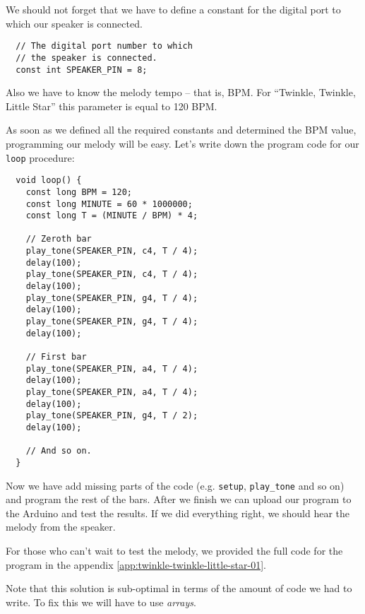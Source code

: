 \documentclass[../sparc.tex]{subfiles}
\begin{document}
We should not forget that we have to define a constant for the digital port to
which our speaker is connected.

\begin{verbatim}
  // The digital port number to which
  // the speaker is connected.
  const int SPEAKER_PIN = 8;
\end{verbatim}

Also we have to know the melody tempo -- that is, \gls{BPM}.  For ``Twinkle,
Twinkle, Little Star'' this parameter is equal to 120 BPM.

As soon as we defined all the required constants and determined the BPM value,
programming our melody will be easy.  Let's write down the program code for our
\texttt{loop} procedure:

\begin{verbatim}
  void loop() {
    const long BPM = 120;
    const long MINUTE = 60 * 1000000;
    const long T = (MINUTE / BPM) * 4;

    // Zeroth bar
    play_tone(SPEAKER_PIN, c4, T / 4);
    delay(100);
    play_tone(SPEAKER_PIN, c4, T / 4);
    delay(100);
    play_tone(SPEAKER_PIN, g4, T / 4);
    delay(100);
    play_tone(SPEAKER_PIN, g4, T / 4);
    delay(100);

    // First bar
    play_tone(SPEAKER_PIN, a4, T / 4);
    delay(100);
    play_tone(SPEAKER_PIN, a4, T / 4);
    delay(100);
    play_tone(SPEAKER_PIN, g4, T / 2);
    delay(100);

    // And so on.
  }
\end{verbatim}

Now we have add missing parts of the code (e.g. \texttt{setup},
\texttt{play\_tone} and so on) and program the rest of the bars.  After we
finish we can upload our program to the Arduino and test the results.  If we did
everything right, we should hear the melody from the speaker.

For those who can't wait to test the melody, we provided the full code for the
program in the appendix \ref{app:twinkle-twinkle-little-star-01}.

Note that this solution is sub-optimal in terms of the amount of code we had to
write.  To fix this we will have to use \emph{arrays}.
\end{document}
